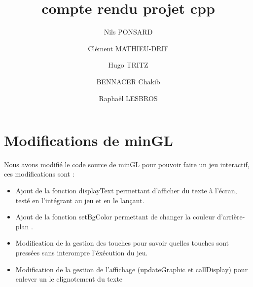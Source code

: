 \documentclass{article}
\begin{document}
\author{Nils PONSARD \and Clément MATHIEU-DRIF \and
Hugo TRITZ \and BENNACER Chakib \and
Raphaël LESBROS}
\title{compte rendu projet cpp}
\maketitle
\section{Modifications de minGL}
\paragraph{} Nous avons modifié le code source de minGL pour pouvoir faire un jeu interactif, ces modifications sont :
\begin{itemize}
    \item Ajout de la fonction displayText permettant d'afficher du texte à l'écran, testé en l'intégrant au jeu et en le lançant.
    \item Ajout de la fonction setBgColor permettant de changer la couleur d'arrière-plan .
    \item Modification de la gestion des touches pour savoir quelles touches sont pressées sans interompre l'éxécution du jeu.
    \item Modification de la gestion de l'affichage (updateGraphic et callDisplay) pour enlever un le clignotement du texte 
    
\end{itemize}
\end{document}
